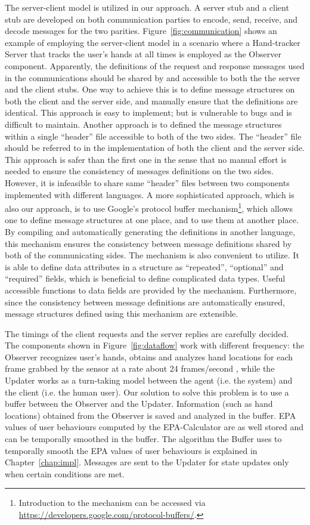 The server-client model is utilized in our approach. A server stub and a client stub are developed on both communication parties to encode, send, receive, and decode messages for the two parities. Figure~\ref{fig:communication} shows an example of employing the server-client model in a scenario where a Hand-tracker Server that tracks the user's hands at all times is employed as the Observer component. Apparently, the definitions of the request and response messages used in the communications should be shared by and accessible to both the  the server and the client stubs. One way to achieve this is to define message structures on both the client and the server side, and manually ensure that the definitions are identical. This approach is easy to implement; but is vulnerable to bugs and is difficult to maintain. Another approach is to defined the message structures within a single ``header'' file accessible to both of the two sides. The ``header'' file should be referred to in the implementation of both the client and the server side. This approach is safer than the first one in the sense that no manual effort is needed to ensure the consistency of messages definitions on the two sides. However, it is infeasible to share same ``header'' files between two components implemented with different languages. A more sophisticated approach, which is also our approach, is to use Google's protocol buffer mechanism\footnote{Introduction to the mechanism can be accessed via \url{https://developers.google.com/protocol-buffers/}.}, which allows one to define message structures at one place, and to use them at another place. By compiling and automatically generating the definitions in another language, this mechanism ensures the consistency between message definitions shared by both of the communicating sides. The mechanism is also convenient to utilize. It is able to define data attributes in a structure as ``repeated'', ``optional'' and ``required'' fields, which is beneficial to define complicated data types. Useful accessible functions to data fields are provided by the mechanism. Furthermore, since the consistency between message definitions are automatically ensured, message structures defined using this mechanism are extensible.

The timings of the client requests and the server replies are carefully decided. The components shown in Figure~\ref{fig:dataflow} work with different frequency: the Observer recognizes user's hands, obtains and analyzes hand locations for each frame grabbed by the sensor at a rate about 24 frames/second , while the Updater works as a turn-taking model between the agent (i.e. the system) and the client (i.e. the human user). Our solution to solve this problem is to use a buffer between the Observer and the Updater. Information (such as hand locations) obtained from the Observer is saved and analyzed in the buffer. EPA values of user behaviours computed by the EPA-Calculator are as well stored and can be temporally smoothed in the buffer. The algorithm the Buffer uses to temporally smooth the EPA values of user behaviours is explained in Chapter~\ref{chap:impl}. Messages are sent to the Updater for state updates only when certain conditions are met. 

